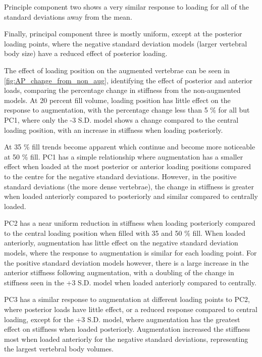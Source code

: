 Principle component two shows a very similar response to loading for all of the standard deviations away from the mean.

Finally, principal component three is mostly uniform, except at the posterior loading points, where the negative standard deviation models (larger vertebral body size) have a reduced effect of posterior loading.


The effect of loading position on the augmented vertebrae can be seen in \cref{fig:AP_change_from_non_aug}, identifying the effect of posterior and anterior loads, comparing the percentage change in stiffness from the non-augmented models.
At 20 percent fill volume, loading position has little effect on the response to augmentation, with the percentage change less than 5 \% for all but PC1, where only the -3 S.D. model shows a change compared to the central loading position, with an increase in stiffness when loading posteriorly.

At 35 \% fill trends become apparent which continue and become more noticeable at 50 \% fill.
PC1 has a simple relationship where augmentation has a smaller effect when loaded at the most posterior or anterior loading positions compared to the centre for the negative standard deviations.
However, in the positive standard deviations (the more dense vertebrae), the change in stiffness is greater when loaded anteriorly compared to posteriorly and similar compared to centrally loaded.

PC2 has a near uniform reduction in stiffness when loading posteriorly compared to the central loading position when filled with 35 and 50 \% fill.
When loaded anteriorly, augmentation has little effect on the negative standard deviation models, where the response to augmentation is similar for each loading point.
For the positive standard deviation models however, there is a large increase in the anterior stiffness following augmentation, with a doubling of the change in stiffness seen in the +3 S.D. model when loaded anteriorly compared to centrally.

PC3 has a similar response to augmentation at different loading points to PC2, where posterior loads have little effect, or a reduced response compared to central loading, except for the +3 S.D. model, where augmentation has the greatest effect on stiffness when loaded posteriorly.
Augmentation increased the stiffness most when loaded anteriorly for the negative standard deviations, representing the largest vertebral body volumes.

